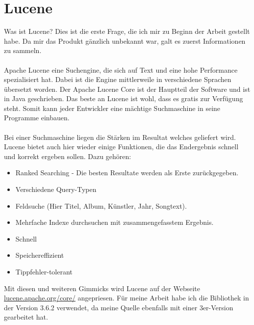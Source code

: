 \documentclass[12pt,a4paper,ngerman]{report}
\begin{document}
\section{Lucene}
Was ist Lucene? Dies ist die erste Frage, die ich mir zu Beginn der Arbeit gestellt habe. Da mir das Produkt gänzlich unbekannt war, galt es zuerst Informationen zu sammeln.\\
\\
Apache Lucene eine Suchengine, die sich auf Text und eine hohe Performance spezialisiert hat. Dabei ist die Engine mittlerweile in verschiedene Sprachen übersetzt worden. Der Apache Lucene Core ist der Hauptteil der Software und ist in Java geschrieben. Das beste an Lucene ist wohl, dass es gratis zur Verfügung steht. Somit kann jeder Entwickler eine mächtige Suchmaschine in seine Programme einbauen. \\
\\
Bei einer Suchmaschine liegen die Stärken im Resultat welches geliefert wird. Lucene bietet auch hier wieder einige Funktionen, die das Endergebnis schnell und korrekt ergeben sollen. Dazu gehören:
\begin{itemize}
	\item Ranked Searching - Die besten Resultate werden als Erste zurückgegeben.
	\item Verschiedene Query-Typen
	\item Feldsuche (Hier Titel, Album, Künstler, Jahr, Songtext).
	\item Mehrfache Indexe durchsuchen mit zusammengefasstem Ergebnis.
	\item Schnell
	\item Speichereffizient
	\item Tippfehler-tolerant
\end{itemize}
Mit diesen und weiteren Gimmicks wird Lucene auf der Webseite \url{lucene.apache.org/core/} angepriesen. Für meine Arbeit habe ich die Bibliothek in der Version 3.6.2 verwendet, da meine Quelle ebenfalls mit einer 3er-Version gearbeitet hat.
\end{document}
